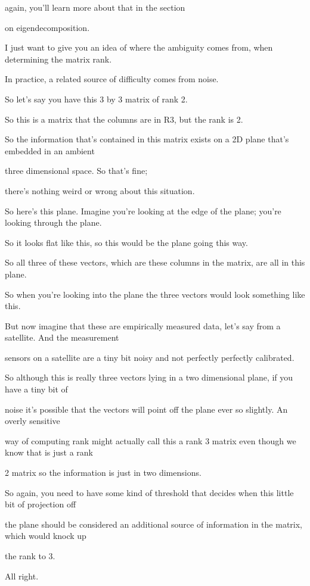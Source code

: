 \documentclass[fleqn,10pt]{olplainarticle}
\theoremstyle{definition}
\theoremstyle{remark}
\begin{document}
again, you'll learn more about that in the section

on eigendecomposition.

I just want to give you an idea of where the ambiguity comes from, when determining the matrix rank.

In practice, a related source of difficulty comes from noise.

So let's say you have this 3 by 3 matrix of rank 2.

So this is a matrix that the columns are in R3, but the rank is 2.

So the information that's contained in this matrix exists on a 2D plane that's embedded in an ambient

three dimensional space. So that's fine;

there's nothing weird or wrong about this situation.

So here's this plane. Imagine you're looking at the edge of the plane; you're looking through the plane.

So it looks flat like this, so this would be the plane going this way.

So all three of these vectors, which are these columns in the matrix, are all in this plane.

So when you're looking into the plane the three vectors would look something like this.

But now imagine that these are empirically measured data, let's say from a satellite. And the measurement

sensors on a satellite are a tiny bit noisy and not perfectly perfectly calibrated.

So although this is really three vectors lying in a two dimensional plane, if you have a tiny bit of

noise it's possible that the vectors will point off the plane ever so slightly. An overly sensitive

way of computing rank might actually call this a rank 3 matrix even though we know that is just a rank

2 matrix so the information is just in two dimensions.

So again, you need to have some kind of threshold that decides when this little bit of projection off

the plane should be considered an additional source of information in the matrix, which would knock up

the rank to 3.

All right.
\end{document}
